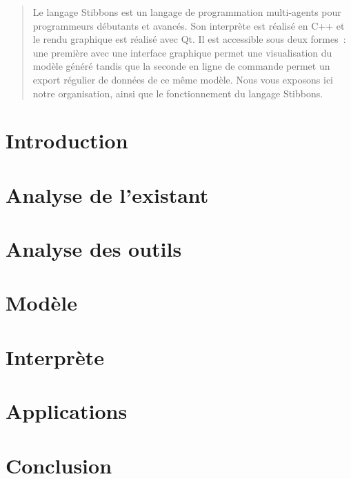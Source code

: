 \documentclass[a4paper,11pt]{report}
\begin{document}
\begin{abstract}
Le langage Stibbons est un langage de programmation multi-agents pour programmeurs débutants et avancés. Son interprète est réalisé en C++ et le rendu graphique est réalisé avec Qt. Il est accessible sous deux formes~: une première avec une interface graphique permet une visualisation du modèle généré tandis que la seconde en ligne de commande permet un export régulier de données de ce même modèle.
Nous vous exposons ici notre organisation, ainsi que le fonctionnement du langage Stibbons.
\end{abstract}

\chapter{Introduction}


\chapter{Analyse de l'existant}




\chapter{Analyse des outils}








\chapter{Modèle}


\chapter{Interprète}


\chapter{Applications}


\chapter{Conclusion}

\end{document}
